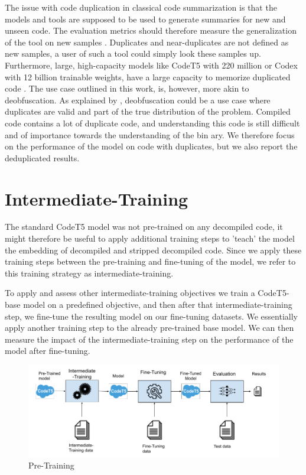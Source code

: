 The issue with code duplication in classical code summarization is that the models and tools are supposed to be used to generate summaries for new and unseen code. The evaluation metrics should therefore measure the generalization of the tool on new samples \cite{allamanis_adverse}. Duplicates and near-duplicates are not defined as new samples, a user of such a tool could simply look these samples up. Furthermore, large, high-capacity models like CodeT5 with 220 million \cite{CodeT5} or Codex with 12 billion \cite{CodeX} trainable weights, have a large capacity to memorize duplicated code \cite{allamanis_adverse}.
The use case outlined in this work, is, however, more akin to deobfuscation. As explained by \citeauthor{allamanis_adverse}, deobfuscation could be a use case where duplicates are valid and part of the true distribution of the problem\cite{allamanis_adverse}. Compiled code contains a lot of duplicate code, and understanding this code is still difficult and of importance towards the understanding of the bin ary. We therefore focus on the performance of the model on code with duplicates, but we also report the deduplicated results.

\section{Intermediate-Training}
The standard CodeT5 model was not pre-trained on any decompiled code, it might therefore be useful to apply additional training steps to 'teach' the model the embedding of decompiled and stripped decompiled code. Since we apply these training steps between the pre-training and fine-tuning of the model, we refer to this training strategy as intermediate-training.

To apply and assess other intermediate-training objectives we train a CodeT5-base model on a predefined objective, and then after that intermediate-training step, we fine-tune the resulting model on our fine-tuning datasets. We essentially apply another training step to the already pre-trained base model. We can then measure the impact of the intermediate-training step on the performance of the model after fine-tuning.

\label{fig:preTraining}
\begin{figure}[H]
  \centering
  \includegraphics[width=\linewidth]{img/pre-training.png}
  \caption{Pre-Training}
\end{figure}

